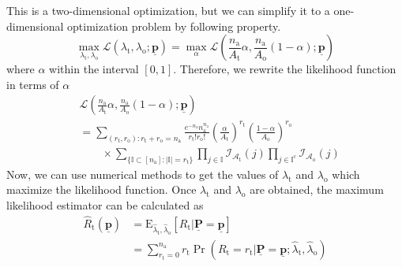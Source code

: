 This is a two-dimensional optimization, but we can simplify it to a one-dimensional optimization problem by following property.
\begin{equation} 
\max_{\lambda_{\mathrm{t}}, \lambda_{\mathrm{o}}}
\mathcal{L} \left( \lambda_{\mathrm{t}}, \lambda_{\mathrm{o}};
\underline{\mathbf{p}} \right)
= \max_{\alpha} \mathcal{L} \left(
\frac{n_{\mathrm{a}}}{A_{\mathrm{t}}} \alpha ,
\frac{n_{\mathrm{a}}}{A_{\mathrm{o}}} (1 - \alpha) ;
\underline{\mathbf{p}} \right)
\end{equation}
where $\alpha$ within the interval $[0, 1]$.
Therefore, we rewrite the likelihood function in terms of $\alpha$
\begin{equation}
\begin{split}
&\mathcal{L} \left(
\frac{n_{\mathrm{a}}}{A_{\mathrm{t}}} \alpha ,
\frac{n_{\mathrm{a}}}{A_{\mathrm{o}}} (1 - \alpha) ;
\underline{\mathbf{p}} \right) \\
&= \sum_{(r_{\mathrm{t}}, r_{\mathrm{o}}) :
	r_{\mathrm{t}} + r_{\mathrm{o}} = n_{\mathrm{a}}}
\frac{e^{- n_{\mathrm{a}}} n_{\mathrm{a}}^{n_{\mathrm{a}}}}
{r_{\mathrm{t}}! r_{\mathrm{o}}!}
\left( \frac{\alpha}{A_{\mathrm{t}}} \right)^{r_{\mathrm{t}}}
\left( \frac{1 - \alpha}{A_{\mathrm{o}}} \right)^{r_{\mathrm{o}}} \\
&\qquad \times \sum_{\{ \mathbb{I} \subset [n_{\mathrm{a}}] : |\mathbb{I}| = r_{\mathrm{t}} \}}
\prod_{j \in \mathbb{I}} \mathcal{I}_{\mathcal{A}_{\mathrm{t}}}(j)
\prod_{j \in \mathbb{I}^{\mathrm{c}}}
\mathcal{I}_{\mathcal{A}_{\mathrm{o}}}(j)
\end{split}
\end{equation}
Now, we can use numerical methods to get the values of $\lambda_{\mathrm{t}}$ and $\lambda_{\mathrm{o}}$ which maximize the likelihood function.
Once $\lambda_{\mathrm{t}}$ and $\lambda_{\mathrm{o}}$ are obtained, the maximum likelihood estimator can be calculated as
\begin{equation} 
\begin{split}
\hat{R}_{\mathrm{t}}
\left( \underline{\mathbf{p}} \right)
&= \mathrm{E}_{\hat{\lambda}_{\mathrm{t}}, \hat{\lambda}_{\mathrm{o}}}
\left[ R_{\mathrm{t}} | \underline{\mathbf{P}}
= \underline{\mathbf{p}} \right] \\
&= \sum_{r_{\mathrm{t}} = 0}^{n_{\mathrm{a}}} r_{\mathrm{t}}
\Pr \left( R_{\mathrm{t}} = r_{\mathrm{t}}
| \underline{\mathbf{P}} = \underline{\mathbf{p}} ;
\hat{\lambda}_{\mathrm{t}}, \hat{\lambda}_{\mathrm{o}} \right) 
\end{split}
\end{equation}
